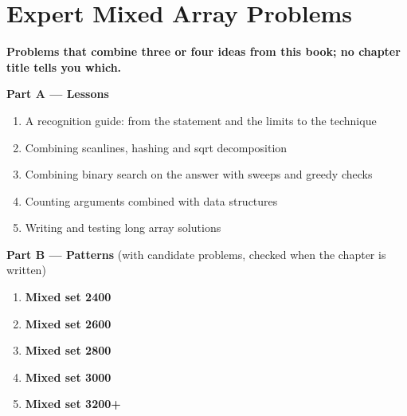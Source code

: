 \chapter{Expert Mixed Array Problems}
\label{ch:expert_mixed}

\begin{tcolorbox}[enhanced, colback=white, colframe=secondaryblue, boxrule=1pt, arc=2mm]
\textbf{\large\textcolor{primaryblue}{Problems that combine three or four ideas from this book; no chapter title tells you which.}}
\end{tcolorbox}


\begin{plannedbox}
\textbf{Part A --- Lessons}
\begin{enumerate}[leftmargin=*, label=\textbf{A\arabic*.}, itemsep=1pt]
    \item A recognition guide: from the statement and the limits to the technique
    \item Combining scanlines, hashing and sqrt decomposition
    \item Combining binary search on the answer with sweeps and greedy checks
    \item Counting arguments combined with data structures
    \item Writing and testing long array solutions
\end{enumerate}
\textbf{Part B --- Patterns} (with candidate problems, checked when the chapter is written)
\begin{enumerate}[leftmargin=*, label=\textbf{P\arabic*.}, itemsep=1pt]
    \item \textbf{Mixed set 2400}
    \item \textbf{Mixed set 2600}
    \item \textbf{Mixed set 2800}
    \item \textbf{Mixed set 3000}
    \item \textbf{Mixed set 3200+}
\end{enumerate}
\end{plannedbox}
